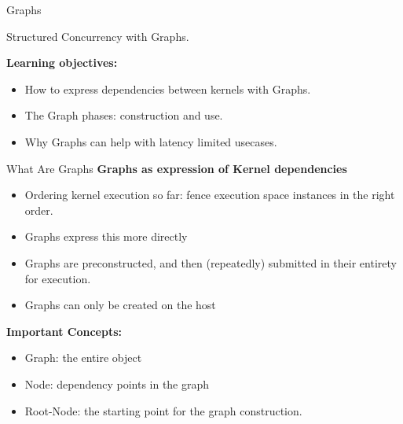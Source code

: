 

\begin{frame}[fragile]

  {\Huge Graphs}

  \vspace{10pt}

	{\large Structured Concurrency with Graphs.}

  \vspace{20pt}

  \textbf{Learning objectives:}
  \begin{itemize}
    \item {How to express dependencies between kernels with Graphs.}
    \item {The Graph phases: construction and use.}
    \item {Why Graphs can help with latency limited usecases.}
  \end{itemize}

  \vspace{-20pt}

\end{frame}


\begin{frame}[fragile]{What Are Graphs}
\textbf{Graphs as expression of Kernel dependencies}

\begin{itemize}
  \item{Ordering kernel execution so far: fence execution space instances in the right order.}
  \item{Graphs express this more directly}
  \item{Graphs are preconstructed, and then (repeatedly) submitted in their entirety for execution.}
  \item{Graphs can only be created on the host}
\end{itemize}

\pause

\textbf{Important Concepts:}

\begin{itemize}
  \item{Graph: the entire object}
  \item{Node: dependency points in the graph}
  \item{Root-Node: the starting point for the graph construction.}
\end{itemize}


\end{frame}

